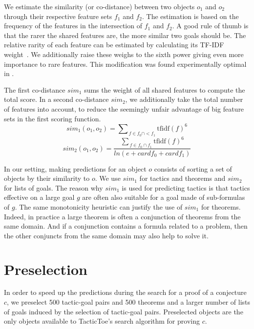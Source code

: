 \documentclass[runningheads,a4paper,draft]{svjour3}
\def\tactictoe{\textsf{TacticToe}\xspace}
\begin{document}
We estimate the similarity (or co-distance) between two objects $o_1$ and $o_2$
through their respective feature sets $f_1$ and $f_2$.
The estimation is based on the frequency of the features in the intersection of
$f_1$ and $f_2$. A good rule of thumb is that the rarer the shared features
are, the more similar two goals should be. The relative rarity of each feature
can be estimated by calculating its TF-IDF weight~\cite{Jones72astatistical}.
We additionally raise these weighs to the sixth power giving
even more importance
to rare features. This modification was found experimentally optimal in
\cite{ckju-pxtp13}.

The first co-distance $sim_1$ sums the weight of all shared
features to compute the total score.
In a second co-distance $sim_2$, we additionally take
the total number of features into account, to reduce the seemingly unfair
advantage of big
feature sets in the first scoring function.
\[sim_1 (o_1, o_2) = {\sum\nolimits_{\,f \in f_0 \cap
<f_1}{\text{tfidf}(f)^{6}}}\]
\[sim_2 (o_1, o_2) = \frac{{\sum\nolimits_{\,f \in f_0 \cap
f_1}{\text{tfidf}(f)^{6}}}}
{ln (e + \mathit{card} f_0 + \mathit{card} f_1)}\]

In our setting, making predictions for an object $o$ consists of sorting a set
of objects by their similarity to $o$. We use $sim_1$ for tactics and theorems
and $sim_2$ for lists of goals. The reason why $sim_1$ is used for
predicting tactics is that tactics effective on a large goal $g$ are often also
suitable for a goal made of sub-formulas of $g$. The same monotonicity
heuristic can justify the use of $sim_1$ for theorems. Indeed, in practice a
large theorem is often a conjunction of theorems from the same domain.
And if a conjunction contains a formula related to a problem, then the other
conjuncts from the same domain may also help to solve it.

\section{Preselection}\label{sec:presel}

In order to speed up the predictions during the search for a proof of a
conjecture $c$, we preselect 500 tactic-goal pairs and 500 theorems and a
larger number of lists of goals induced by the selection of tactic-goal pairs.
Preselected objects are the only objects available to \tactictoe's search
algorithm for proving $c$.

\end{document}
